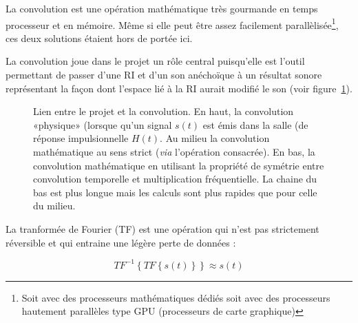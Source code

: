 La convolution est une opération mathématique très gourmande en temps processeur et en mémoire. Même si elle peut être
assez facilement parallèlisée\footnote{Soit avec des processeurs mathématiques dédiés soit avec des processeurs
hautement parallèles type GPU (processeurs de carte graphique)}, ces deux solutions étaient hors de portée ici.

La convolution joue dans le projet un rôle central puisqu'elle est l'outil permettant de passer d'une RI et d'un son
anéchoïque à un résultat sonore représentant la façon dont l'espace lié à la RI aurait modifié le son (voir
figure~\ref{lien_convo_projet}).

\begin{figure}[h!]
\caption{\label{lien_convo_projet}Lien entre le projet et la convolution. En haut, la convolution «physique» (lorsque
qu'un signal $s(t)$ est émis dans la salle (de réponse impulsionnelle $H(t)$. Au milieu la convolution mathématique au
sens strict (\textit{via} l'opération consacrée). En bas, la convolution mathématique en utilisant la propriété de
symétrie entre convolution temporelle et multiplication fréquentielle. La chaine du bas est plus longue mais les calculs
sont plus rapides que pour celle du milieu.}
\end{figure}

La tranformée de Fourier (TF) est une opération qui n'est pas strictement réversible et qui entraine une légère perte de
données :

$$TF^{-1}\left\{TF\left\{s(t)\right\}\right\} \approx s(t)$$

